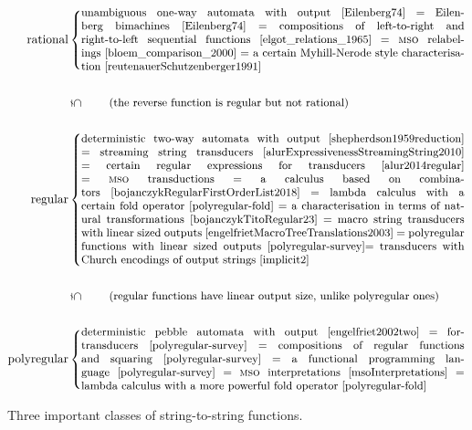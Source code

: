 

\newcommand{\functionclass}[2]{
    \text{#1} & 
\left\{{\text{\begin{minipage}{11cm}
    \small 
#2
\end{minipage}}}\right. 
}

\newcommand{\vertinclusion}[1]{\\ &
\mathrel{\rotatebox[origin=c]{270}{$\subsetneq$}}
\text{\qquad \small(#1)}\\ \\ }

\begin{figure}
    \centering
\begin{align*}
    \functionclass{rational}{
        unambiguous one-way automata with output~\cite[Chapter IX]{Eilenberg74}  =  Eilenberg bimachines~\cite[XI.7]{Eilenberg74} =  compositions of left-to-right and right-to-left sequential functions~\cite[Proposition 7.3]{elgot_relations_1965}   = \mso relabelings~\cite[p.~11]{bloem_comparison_2000} = a certain Myhill-Nerode style characterisation~\cite[Theorem 1]{reutenauerSchutzenberger1991}
    } \\
\vertinclusion{the reverse function is regular but not rational}
\functionclass{regular}{ deterministic two-way automata with output~\cite[Note 4]{shepherdson1959reduction} = streaming string transducers~\cite[Theorems 1,2,3]{alurExpressivenessStreamingString2010} = certain regular expressions for transducers~\cite[Theorem 15]{alur2014regular}  = \mso transductions = a calculus based on combinators~\cite[Theorem 6.1]{bojanczykRegularFirstOrderList2018} = lambda calculus with a certain fold operator~\cite[Theorem VI.1]{polyregular-fold} =   a characterisation in terms of natural transformations~\cite[Theorem 3.2]{bojanczykTitoRegular23} = macro string transducers with linear sized outputs~\cite[Theorem 7.1]{engelfrietMacroTreeTranslations2003} = polyregular functions with linear sized outputs~\cite[Example 11]{polyregular-survey}= transducers with Church encodings of output strings~\cite[Theorem 1.1]{implicit2}  } \\
\vertinclusion{regular functions have linear output size, unlike polyregular ones}
\functionclass{polyregular}{
deterministic pebble automata with output~\cite[p.~235]{engelfriet2002two} = for-transducers~\cite[Theorem 2.1]{polyregular-survey} = compositions of regular functions and squaring~\cite[Theorem 3.2]{polyregular-survey} = a functional programming language~\cite[Theorem 4.1]{polyregular-survey} = \mso interpretations~\cite[Theorem 7]{msoInterpretations} = lambda calculus with a more powerful fold operator~\cite[Theorem V.3]{polyregular-fold} 
} 
\end{align*}
    \caption{Three important classes of string-to-string functions.}
    \label{fig:transducer-classes}
\end{figure}